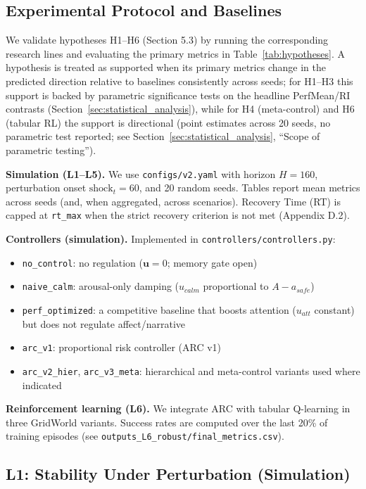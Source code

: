 \documentclass{article}
\begin{document}
\subsection{Experimental Protocol and Baselines}

We validate hypotheses H1--H6 (Section 5.3) by running the corresponding research lines and evaluating the primary metrics in Table~\ref{tab:hypotheses}. A hypothesis is treated as supported when its primary metrics change in the predicted direction relative to baselines consistently across seeds; for H1--H3 this support is backed by parametric significance tests on the headline PerfMean/RI contrasts (Section~\ref{sec:statistical_analysis}), while for H4 (meta-control) and H6 (tabular RL) the support is directional (point estimates across 20 seeds, no parametric test reported; see Section~\ref{sec:statistical_analysis}, ``Scope of parametric testing'').

\textbf{Simulation (L1--L5).} We use \texttt{configs/v2.yaml} with horizon $H=160$, perturbation onset $\text{shock}_t=60$, and 20 random seeds. Tables report mean metrics across seeds (and, when aggregated, across scenarios). Recovery Time (RT) is capped at \texttt{rt\_max} when the strict recovery criterion is not met (Appendix D.2).

\textbf{Controllers (simulation).} Implemented in \texttt{controllers/controllers.py}:
\begin{itemize}
    \item \texttt{no\_control}: no regulation ($\mathbf{u}=0$; memory gate open)
    \item \texttt{naive\_calm}: arousal-only damping ($u_{calm}$ proportional to $A-a_{safe}$)
    \item \texttt{perf\_optimized}: a competitive baseline that boosts attention ($u_{att}$ constant) but does not regulate affect/narrative
    \item \texttt{arc\_v1}: proportional risk controller (ARC v1)
    \item \texttt{arc\_v2\_hier}, \texttt{arc\_v3\_meta}: hierarchical and meta-control variants used where indicated
\end{itemize}

\textbf{Reinforcement learning (L6).} We integrate ARC with tabular Q-learning \cite{Watkins1992, Sutton2018} in three GridWorld variants. Success rates are computed over the last 20\% of training episodes (see \texttt{outputs\_L6\_robust/final\_metrics.csv}).

\subsection{L1: Stability Under Perturbation (Simulation)}
\end{document}
